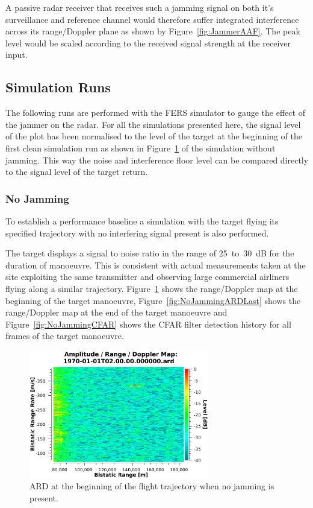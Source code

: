 \documentclass[english, 12pt]{report}
\begin{document}
A passive radar receiver that receives such a jamming signal on both it's surveillance and reference channel would therefore suffer integrated interference across its range/Doppler plane as shown by Figure~\ref{fig:JammerAAF}. The peak level would be scaled according to the received signal strength at the receiver input.

\subsection{Simulation Runs}\label{sec:ECMSims}
The following runs are performed with the FERS simulator to gauge the effect of the jammer on the radar. For all the simulations presented here, the signal level of the plot has been normalised to the level of the target at the beginning of the first clean simulation run as shown in Figure~\ref{fig:NoJammingARDFirst} of the simulation without jamming. This way the noise and interference floor level can be compared directly to the signal level of the target return.

\subsubsection{No Jamming}
To establish a performance baseline a simulation with the target flying its specified trajectory with no interfering signal present is also performed.

The target displays a signal to noise ratio in the range of 25~to~30~dB for the duration of manoeuvre. This is consistent with actual measurements taken at the site exploiting the same transmitter and observing large commercial airliners flying along a similar trajectory. Figure~\ref{fig:NoJammingARDFirst} shows the range/Doppler map at the beginning of the target manoeuvre, Figure~\ref{fig:NoJammingARDLast} shows the range/Doppler map at the end of the target manoeuvre and Figure~\ref{fig:NoJammingCFAR} shows the CFAR filter detection history for all frames of the target manoeuvre.

\begin{figure}[htbp]
\begin{center}
\includegraphics[width=0.7\textwidth]{figs/Simulations/NoJammingARDFirst.pdf}
\caption{ARD at the beginning of the flight trajectory when no jamming is present.}
\label{fig:NoJammingARDFirst}
\end{center}
\end{figure}
\end{document}
